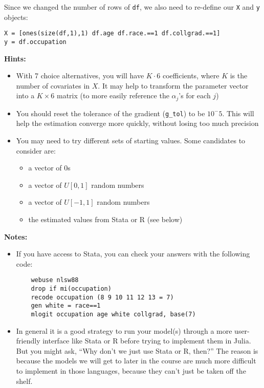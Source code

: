 \documentclass[12pt,english]{article}
\begin{document}
\begin{enumerate}
Since we changed the number of rows of \texttt{df}, we also need to re-define our \texttt{X} and \texttt{y} objects:
\begin{verbatim}
X = [ones(size(df,1),1) df.age df.race.==1 df.collgrad.==1]
y = df.occupation
\end{verbatim}

\textbf{Hints:} 
\begin{itemize}
    \item With 7 choice alternatives, you will have $K\cdot 6$ coefficients, where $K$ is the number of covariates in $X$. It may help to transform the parameter vector into a $K\times6$ matrix (to more easily reference the $\alpha_j$'s for each $j$)
    \item You should reset the tolerance of the gradient (\texttt{g\_tol}) to be $10^-5$. This will help the estimation converge more quickly, without losing too much precision
    \item You may need to try different sets of starting values. Some candidates to consider are:
        \begin{itemize} 
        \item a vector of 0s
        \item a vector of $U[0,1]$ random numbers
        \item a vector of $U[-1,1]$ random numbers
        \item the estimated values from Stata or R (see below)
        \end{itemize}
\end{itemize}

\textbf{Notes:} 
\begin{itemize}
    \item If you have access to Stata, you can check your answers with the following code:
    \begin{verbatim}
    webuse nlsw88
    drop if mi(occupation)
    recode occupation (8 9 10 11 12 13 = 7)
    gen white = race==1
    mlogit occupation age white collgrad, base(7)
    \end{verbatim}
    \item In general it is a good strategy to run your model(s) through a more user-friendly interface like Stata or R before trying to implement them in Julia. But you might ask, ``Why don't we just use Stata or R, then?'' The reason is because the models we will get to later in the course are much more difficult to implement in those languages, because they can't just be taken off the shelf.
\end{itemize}



\end{enumerate}
\end{document}
